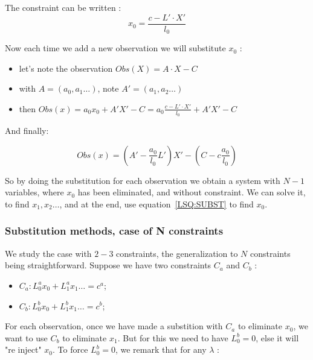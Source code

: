 The constraint can be written :
\begin{equation}
    x_0 = \frac{c-L' \cdot X'}{l_0} \label{LSQ:SUBST}
\end{equation}

Now  each time we add a new observation we will substitute $x_0$ :

\begin{itemize}
      \item let's note the observation  $Obs(X) = A \cdot X - C$
      \item with $A= (a_0,a_1 \dots)$, note  $A' = (a_1,a_2 \dots) $
       \item then   $Obs(x) = a_0 x_0 + A' X'-C= a_0\frac{c-L' \cdot X'}{l_0} + A'X' -C$
\end{itemize}

And finally:

\begin{equation}
    Obs(x) = (A'- \frac{a_0}{l_0} L') X'  - (C -c\frac{a_0}{l_0})
\end{equation}

So by doing the substitution for each observation we obtain a system with $N-1$ variables,
where $x_0$ has been eliminated, and without constraint. We can solve it, to find $x_1, x_2 \dots $,
and at the end, use equation~\ref{LSQ:SUBST} to find $x_0$.



\subsubsection{Substitution methods, case of N constraints}
\label{CSTR:NSUBST}

We study the case with $2-3$ constraints, the generalization to $N$ constraints being straightforward.
Suppose we have two constraints $C_a$ and $C_b$ :

\begin{itemize}
    \item $C_a : L^a_0 x_0 +  L^a_1 x_1 \dots    = c^a$;
    \item $C_b : L^b_0 x_0 +  L^b_1 x_1 \dots    = c^b$;
\end{itemize}

For each observation, once we have made a substition with $C_a$ to eliminate $x_0$,
 we  want to use $C_b$ to eliminate $x_1$.
But for this we need to have $ L^b_0=0$, else it will "re inject" $x_0$.  To
force $L^b_0=0$, we remark  that for any $\lambda$ :

